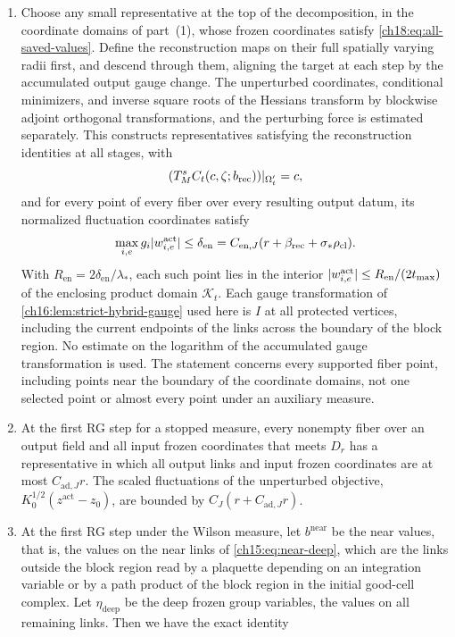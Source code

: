 \begin{theorem}
\begin{enumerate}
\item Choose any small representative at the top of the decomposition, in the coordinate domains of part~(1), whose frozen coordinates satisfy \eqref{ch18:eq:all-saved-values}. Define the reconstruction maps on their full spatially varying radii first, and descend through them, aligning the target at each step by the accumulated output gauge change. The unperturbed coordinates, conditional minimizers, and inverse square roots of the Hessians transform by blockwise adjoint orthogonal transformations, and the perturbing force is estimated separately. This constructs representatives satisfying the reconstruction identities at all stages, with
\[
 (T_M^s C_t(c,\zeta;b_{\mathrm{rec}}))|_{\Omega'_t}=c,
\]
and for every point of every fiber over every resulting output datum, its normalized fluctuation coordinates satisfy
\[
 \max_{i,e}g_i\lvert w_{i,e}^{\mathrm{act}}\rvert
 \le\delta_{\mathrm{en}}
 =C_{\mathrm{en},J}(r+\beta_{\mathrm{rec}}+\sigma_*\rho_{\mathrm{cl}}).
\]
With $R_{\mathrm{en}}=2\delta_{\mathrm{en}}/\lambda_*$, each such point lies in the interior $\lvert w_{i,e}^{\mathrm{act}}\rvert\le R_{\mathrm{en}}/(2t_{\max})$ of the enclosing product domain $\mathcal K_t$. Each gauge transformation of \cref{ch16:lem:strict-hybrid-gauge} used here is $I$ at all protected vertices, including the current endpoints of the links across the boundary of the block region. No estimate on the logarithm of the accumulated gauge transformation is used. The statement concerns every supported fiber point, including points near the boundary of the coordinate domains, not one selected point or almost every point under an auxiliary measure.
\item At the first RG step for a stopped measure, every nonempty fiber over an output field and all input frozen coordinates that meets $D_r$ has a representative in which all output links and input frozen coordinates are at most $C_{\mathrm{ad},J}r$. The scaled fluctuations of the unperturbed objective, $K_0^{1/2}(z^{\mathrm{act}}-z_0)$, are bounded by $C_J(r+C_{\mathrm{ad},J}r)$.
\item At the first RG step under the Wilson measure, let $b^{\mathrm{near}}$ be the near values, that is, the values on the near links of \eqref{ch15:eq:near-deep}, which are the links outside the block region read by a plaquette depending on an integration variable or by a path product of the block region in the initial good-cell complex. Let $\eta_{\mathrm{deep}}$ be the deep frozen group variables, the values on all remaining links. Then we have the exact identity

\end{enumerate}
\end{theorem}
